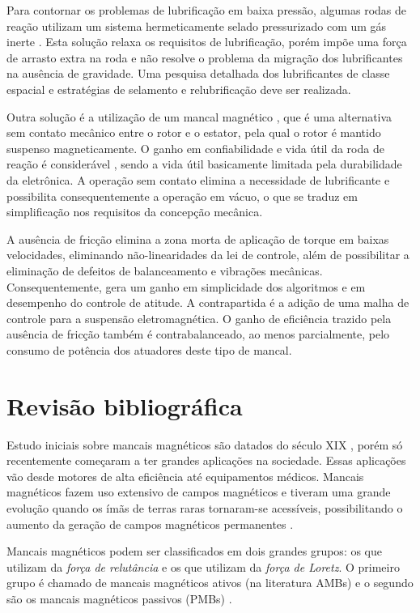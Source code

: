 Para contornar os problemas de lubrificação em baixa pressão, algumas rodas de reação  utilizam um sistema hermeticamente selado pressurizado com um gás inerte \citep{Krishnan2010}. Esta solução relaxa os requisitos de lubrificação, porém impõe uma força de arrasto extra na roda e não resolve o problema da migração dos lubrificantes na ausência de gravidade. Uma pesquisa detalhada dos lubrificantes de classe espacial e estratégias de selamento e relubrificação deve ser realizada.

Outra solução é a utilização de um mancal magnético \citep{Bangcheng2012}, que é uma alternativa sem contato mecânico entre o rotor e o estator, pela qual o rotor é mantido suspenso magneticamente. O ganho em confiabilidade e vida útil da roda de reação é considerável \citep{Marble2006}, sendo a vida útil basicamente limitada  pela durabilidade da eletrônica. A operação sem contato elimina a necessidade de lubrificante e possibilita consequentemente a operação em vácuo, o que se traduz em simplificação nos requisitos da concepção mecânica. 

A ausência de fricção elimina a zona morta de aplicação de torque em baixas velocidades, eliminando não-linearidades da lei de controle, além de possibilitar a eliminação de defeitos de balanceamento e vibrações mecânicas. Consequentemente, gera um ganho em simplicidade dos algoritmos e em desempenho do controle de atitude. A contrapartida é a adição de uma malha de controle para a suspensão eletromagnética. O ganho de eficiência trazido pela ausência de fricção também é contrabalanceado, ao menos parcialmente, pelo consumo de potência dos atuadores deste tipo de mancal.


\section{Revisão bibliográfica}


Estudo iniciais sobre mancais magnéticos são datados do século XIX \citep{Weise1989}, porém só recentemente começaram a ter grandes aplicações na sociedade. Essas aplicações vão desde motores de alta eficiência até equipamentos médicos. Mancais magnéticos fazem uso extensivo de campos magnéticos e tiveram uma grande evolução quando os ímãs de terras raras tornaram-se acessíveis, possibilitando o aumento da geração de campos magnéticos permanentes \cite{Furlani2001d}.

Mancais magnéticos podem ser classificados em dois grandes grupos: os que utilizam da \textit{força de relutância} e os que utilizam da \textit{força de Loretz}. O primeiro grupo é chamado de mancais magnéticos ativos (na literatura AMBs) e o segundo são os mancais magnéticos passivos (PMBs) \cite{Schweitzer2009}.

